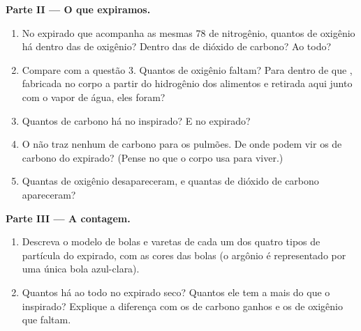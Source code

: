\begin{problem}
\medskip
\noindent\textbf{Parte II --- O  que expiramos.}
\begin{enumerate}[resume]
  \item No  expirado que acompanha as mesmas 78  de
        nitrogênio, quantos  de oxigênio há dentro das  de
        oxigênio? Dentro das  de dióxido de carbono? Ao todo?
  \item Compare com a questão 3. Quantos  de oxigênio faltam? Para
        dentro de que , fabricada no corpo a partir do hidrogênio
        dos alimentos e retirada aqui junto com o vapor de água, eles
        foram?
  \item Quantos  de carbono há no  inspirado? E no  expirado?
  \item O  não traz nenhum  de carbono para os pulmões. De onde
        podem vir os  de carbono do  expirado? (Pense no que o
        corpo usa para viver.)
  \item Quantas  de oxigênio desapareceram, e quantas 
        de dióxido de carbono apareceram?
\end{enumerate}

\medskip
\noindent\textbf{Parte III --- A contagem.}
\begin{enumerate}[resume]
  \item Descreva o modelo de bolas e varetas de cada um dos quatro tipos
        de partícula do  expirado, com as cores das bolas (o argônio é
        representado por uma única bola azul-clara).
  \item Quantos  há ao todo no  expirado seco? Quantos  ele
        tem a mais do que o  inspirado? Explique a diferença com os
         de carbono ganhos e os  de oxigênio que faltam.
\end{enumerate}
\end{problem}
